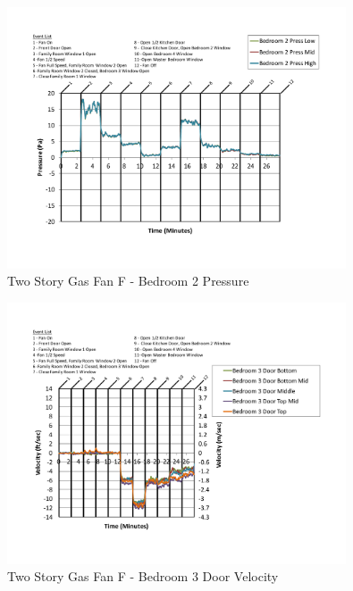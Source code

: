 \documentclass{article}
\begin{document}
\begin{appendices}
	\begin{figure}[H]
		\centering
		\includegraphics[height=3.05in,trim=0.67in 1.1in 0.67in 0.8in,clip=true]{0_Images/Results_Charts/ColdFlow/Two_Story/Gas/F/Bedroom_2_Pressure.pdf}
		\caption{Two Story Gas Fan F - Bedroom 2 Pressure}
	\end{figure}
 

	\begin{figure}[H]
		\centering
		\includegraphics[height=3.05in,trim=0.67in 1.1in 0.67in 0.8in,clip=true]{0_Images/Results_Charts/ColdFlow/Two_Story/Gas/F/Bedroom_3_Door_Velocity.pdf}
		\caption{Two Story Gas Fan F - Bedroom 3 Door Velocity}
	\end{figure}
 
	\clearpage


\end{appendices}
\end{document}
